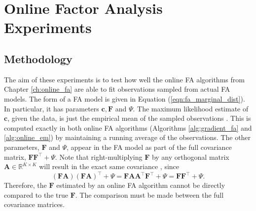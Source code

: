 \documentclass[msc,deptreport.inf]{infthesis} %
\newcommand{\matr}[1]{\mathbf{#1}}
\newcommand{\R}{\mathbb R}
\begin{document}
\chapter{Online Factor Analysis Experiments}\label{ch:online_fa_experiments}


\section{Methodology}

The aim of these experiments is to test how well the online FA algorithms from Chapter \ref{ch:online_fa} are able to fit observations sampled from actual FA models. The form of a FA model is given in Equation (\ref{eqn:fa_marginal_dist}). In particular, it has parameters $\matr{c}, \matr{F}$ and $\Psi$. The maximum likelihood estimate of $\matr{c}$, given the data, is just the empirical mean of the sampled observations \cite{barber2007}. This is computed exactly in both online FA algorithms (Algorithms \ref{alg:gradient_fa} and \ref{alg:online_em}) by maintaining a running average of the observations. The other parameters, $\matr{F}$ and $\Psi$, appear in the FA model as part of the full covariance matrix,  $\matr{F}\matr{F}^\intercal + \Psi$. Note that right-multiplying $\matr{F}$ by any orthogonal matrix $\matr{A} \in \R^{K \times K}$ will result in the exact same covariance \cite{barber2007}, since
\begin{equation}
	(\matr{F} \matr{A}) (\matr{F} \matr{A})^\intercal + \Psi
	= \matr{F} \matr{A} \matr{A}^\intercal \matr{F}^\intercal + \Psi
	= \matr{F} \matr{F}^\intercal + \Psi.
\end{equation}
Therefore, the $\matr{F}$ estimated by an online FA algorithm cannot be directly compared to the true $\matr{F}$. The comparison must be made between the full covariance matrices.  
\end{document}
